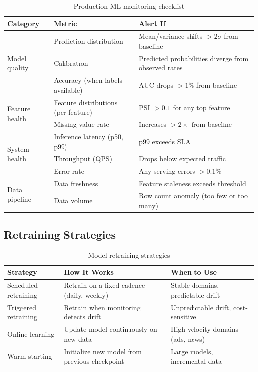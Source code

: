 \begin{table}[H]
\centering
\caption{Production ML monitoring checklist}
\begin{tabularx}{\textwidth}{llX}
\toprule
\textbf{Category} & \textbf{Metric} & \textbf{Alert If} \\
\midrule
\multirow{3}{*}{Model quality} & Prediction distribution & Mean/variance shifts $> 2\sigma$ from baseline \\
 & Calibration & Predicted probabilities diverge from observed rates \\
 & Accuracy (when labels available) & AUC drops $> 1\%$ from baseline \\
\midrule
\multirow{2}{*}{Feature health} & Feature distributions (per feature) & PSI $> 0.1$ for any top feature \\
 & Missing value rate & Increases $> 2\times$ from baseline \\
\midrule
\multirow{3}{*}{System health} & Inference latency (p50, p99) & p99 exceeds SLA \\
 & Throughput (QPS) & Drops below expected traffic \\
 & Error rate & Any serving errors $> 0.1\%$ \\
\midrule
\multirow{2}{*}{Data pipeline} & Data freshness & Feature staleness exceeds threshold \\
 & Data volume & Row count anomaly (too few or too many) \\
\bottomrule
\end{tabularx}
\end{table}

\subsection{Retraining Strategies}

\begin{table}[H]
\centering
\caption{Model retraining strategies}
\begin{tabularx}{\textwidth}{lXX}
\toprule
\textbf{Strategy} & \textbf{How It Works} & \textbf{When to Use} \\
\midrule
Scheduled retraining & Retrain on a fixed cadence (daily, weekly) & Stable domains, predictable drift \\
Triggered retraining & Retrain when monitoring detects drift & Unpredictable drift, cost-sensitive \\
Online learning & Update model continuously on new data & High-velocity domains (ads, news) \\
Warm-starting & Initialize new model from previous checkpoint & Large models, incremental data \\
\bottomrule
\end{tabularx}
\end{table}

